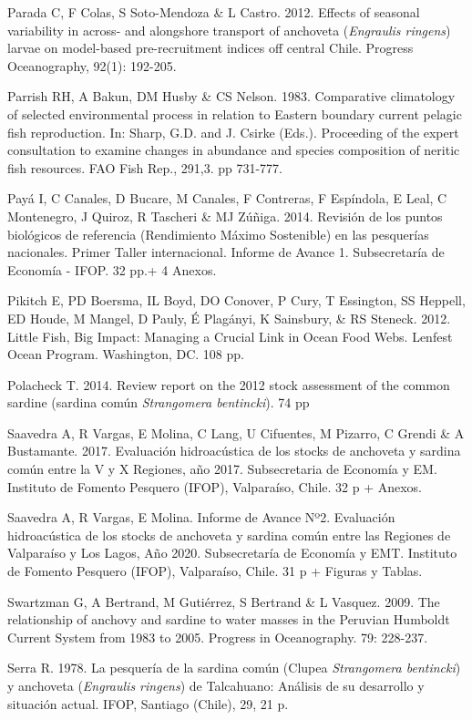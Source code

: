 \documentclass[
  spanish,
]{article}
\begin{document}
Parada C, F Colas, S Soto-Mendoza \& L Castro. 2012. Effects of seasonal
variability in across- and alongshore transport of anchoveta
(\emph{Engraulis ringens}) larvae on model-based pre-recruitment indices
off central Chile. Progress Oceanography, 92(1): 192-205.

Parrish RH, A Bakun, DM Husby \& CS Nelson. 1983. Comparative
climatology of selected environmental process in relation to Eastern
boundary current pelagic fish reproduction. In: Sharp, G.D. and J.
Csirke (Eds.). Proceeding of the expert consultation to examine changes
in abundance and species composition of neritic fish resources. FAO Fish
Rep., 291,3. pp 731-777.

Payá I, C Canales, D Bucare, M Canales, F Contreras, F Espíndola, E
Leal, C Montenegro, J Quiroz, R Tascheri \& MJ Zúñiga. 2014. Revisión de
los puntos biológicos de referencia (Rendimiento Máximo Sostenible) en
las pesquerías nacionales. Primer Taller internacional. Informe de
Avance 1. Subsecretaría de Economía - IFOP. 32 pp.+ 4 Anexos.

Pikitch E, PD Boersma, IL Boyd, DO Conover, P Cury, T Essington, SS
Heppell, ED Houde, M Mangel, D Pauly, É Plagányi, K Sainsbury, \& RS
Steneck. 2012. Little Fish, Big Impact: Managing a Crucial Link in Ocean
Food Webs. Lenfest Ocean Program. Washington, DC. 108 pp.

Polacheck T. 2014. Review report on the 2012 stock assessment of the
common sardine (sardina común \emph{Strangomera bentincki}). 74 pp

Saavedra A, R Vargas, E Molina, C Lang, U Cifuentes, M Pizarro, C Grendi
\& A Bustamante. 2017. Evaluación hidroacústica de los stocks de
anchoveta y sardina común entre la V y X Regiones, año 2017.
Subsecretaria de Economía y EM. Instituto de Fomento Pesquero (IFOP),
Valparaíso, Chile. 32 p + Anexos.

Saavedra A, R Vargas, E Molina. Informe de Avance Nº2. Evaluación
hidroacústica de los stocks de anchoveta y sardina común entre las
Regiones de Valparaíso y Los Lagos, Año 2020. Subsecretaría de Economía
y EMT. Instituto de Fomento Pesquero (IFOP), Valparaíso, Chile. 31 p +
Figuras y Tablas.

Swartzman G, A Bertrand, M Gutiérrez, S Bertrand \& L Vasquez. 2009. The
relationship of anchovy and sardine to water masses in the Peruvian
Humboldt Current System from 1983 to 2005. Progress in Oceanography. 79:
228-237.

Serra R. 1978. La pesquería de la sardina común (Clupea
\emph{Strangomera bentincki}) y anchoveta (\emph{Engraulis ringens}) de
Talcahuano: Análisis de su desarrollo y situación actual. IFOP, Santiago
(Chile), 29, 21 p.
\end{document}
